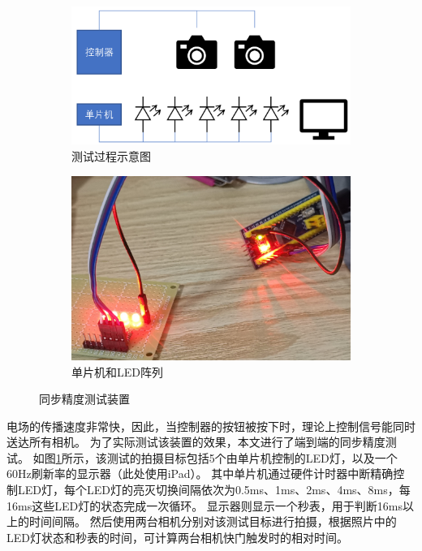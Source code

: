 \begin{figure}
\centering
\begin{subfigure}[b]{0.55\textwidth}
    \includegraphics[width=\textwidth]{figures/passive_sync_test}
    \caption{测试过程示意图}
\end{subfigure}%
\begin{subfigure}[b]{0.44\textwidth}
    \includegraphics[width=\textwidth]{figures/LED_array}
    \caption{单片机和LED阵列}
\end{subfigure}%
\caption{同步精度测试装置}
\label{fig:passive_sync_test}
\end{figure}

电场的传播速度非常快，因此，当控制器的按钮被按下时，理论上控制信号能同时送达所有相机。
为了实际测试该装置的效果，本文进行了端到端的同步精度测试。
如图\ref{fig:passive_sync_test}所示，该测试的拍摄目标包括5个由单片机控制的LED灯，以及一个60Hz刷新率的显示器（此处使用iPad）。
其中单片机通过硬件计时器中断精确控制LED灯，每个LED灯的亮灭切换间隔依次为0.5ms、1ms、2ms、4ms、8ms，每16ms这些LED灯的状态完成一次循环。
显示器则显示一个秒表，用于判断16ms以上的时间间隔。
然后使用两台相机分别对该测试目标进行拍摄，根据照片中的LED灯状态和秒表的时间，可计算两台相机快门触发时的相对时间。

